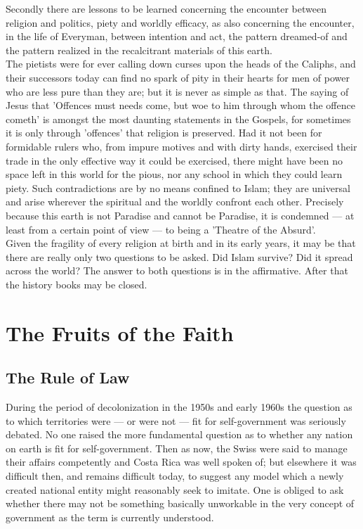 \documentclass[11pt, b5paper, twoside]{book}
\begin{document}
Secondly there are lessons to be learned concerning the encounter between religion and politics, 
piety and worldly efficacy, as also concerning the encounter, in the life of Everyman, between 
intention and act, the pattern dreamed-of and the pattern realized in the recalcitrant materials of 
this earth. \\

The pietists were for ever calling down curses upon the heads of the Caliphs, and their successors 
today can find no spark of pity in their hearts for men of power who are less pure than they are; but 
it is never as simple as that. The saying of Jesus that 'Offences must needs come, but woe to him 
through whom the offence cometh' is amongst the most daunting statements in the Gospels, for 
sometimes it is only through 'offences' that religion is preserved. Had it not been for formidable 
rulers who, from impure motives and with dirty hands, exercised their trade in the only effective way 
it could be exercised, there might have been no space left in this world for the pious, nor any 
school in which they could learn piety. Such contradictions are by no means confined to Islam; they 
are universal and arise wherever the spiritual and the worldly confront each other. Precisely because 
this earth is not Paradise and cannot be Paradise, it is condemned --- at least from a certain point of 
view --- to being a 'Theatre of the Absurd'. \\

Given the fragility of every religion at birth and in its early years, it may be that there are 
really only two questions to be asked. Did Islam survive? Did it spread across the world? The answer 
to both questions is in the affirmative. After that the history books may be closed. \\


\part{The Fruits of the Faith}
\chapter{The Rule of Law}


During the period of decolonization in the 1950s and early 1960s the question as to which territories 
were --- or were not --- fit for self-government was seriously debated. No one raised the more 
fundamental question as to whether any nation on earth is fit for self-government. Then as now, the 
Swiss were said to manage their affairs competently and Costa Rica was well spoken of; but elsewhere 
it was difficult then, and remains difficult today, to suggest any model which a newly created 
national entity might reasonably seek to imitate. One is obliged to ask whether there may not be 
something basically unworkable in the very concept of government as the term is currently understood. \\
\end{document}
